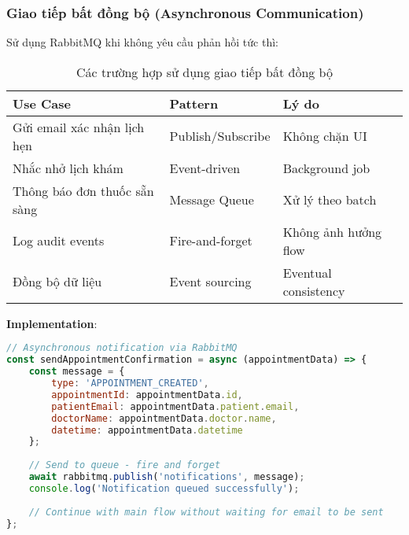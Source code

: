 \documentclass[12pt,a4paper]{report}
\begin{document}
\subsubsection{Giao tiếp bất đồng bộ (Asynchronous Communication)}
Sử dụng RabbitMQ khi không yêu cầu phản hồi tức thì:

\begin{table}[h]
\centering
\caption{Các trường hợp sử dụng giao tiếp bất đồng bộ}
\begin{tabular}{|l|l|l|}
\hline
\textbf{Use Case} & \textbf{Pattern} & \textbf{Lý do} \\
\hline
Gửi email xác nhận lịch hẹn & Publish/Subscribe & Không chặn UI \\
\hline
Nhắc nhở lịch khám & Event-driven & Background job \\
\hline
Thông báo đơn thuốc sẵn sàng & Message Queue & Xử lý theo batch \\
\hline
Log audit events & Fire-and-forget & Không ảnh hưởng flow \\
\hline
Đồng bộ dữ liệu & Event sourcing & Eventual consistency \\
\hline
\end{tabular}
\end{table}

\textbf{Implementation}:
\begin{lstlisting}[language=JavaScript, caption=RabbitMQ publisher example]
// Asynchronous notification via RabbitMQ
const sendAppointmentConfirmation = async (appointmentData) => {
    const message = {
        type: 'APPOINTMENT_CREATED',
        appointmentId: appointmentData.id,
        patientEmail: appointmentData.patient.email,
        doctorName: appointmentData.doctor.name,
        datetime: appointmentData.datetime
    };
    
    // Send to queue - fire and forget
    await rabbitmq.publish('notifications', message);
    console.log('Notification queued successfully');
    
    // Continue with main flow without waiting for email to be sent
};
\end{lstlisting}
\end{document}
